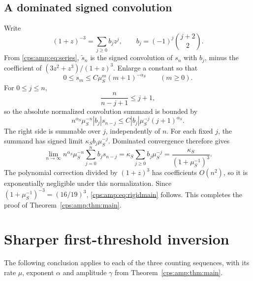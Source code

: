 \documentclass[11pt,letterpaper]{article}
\numberwithin{equation}{section}
\theoremstyle{remark}\newtheorem{remark}[theorem]{Remark}
\begin{document}
\subsection{A dominated signed convolution}
Write
\begin{equation}
 (1+z)^{-3}=\sum_{j\ge0}b_jz^j,\qquad
 b_j=(-1)^j\binom{j+2}{2}.
\end{equation}
From \eqref{cps:amp:eq:series}, $\widetilde s_n$ is the signed convolution of $s_n$ with $b_j$, minus the coefficient of $(3z^2+z^3)/(1+z)^3$. Enlarge a constant so that
\begin{equation}
 0\le s_m\le C\mu_S^m(m+1)^{-\alpha_S}\qquad(m\ge0).
\end{equation}
For $0\le j\le n$,
\begin{equation}
 \frac{n}{n-j+1}\le j+1,
\end{equation}
so the absolute normalized convolution summand is bounded by
\begin{equation}\label{cps:amp:eq:convolutionmajorant}
 n^{\alpha_S}\mu_S^{-n}|b_j|s_{n-j}
 \le C|b_j|\mu_S^{-j}(j+1)^{\alpha_S}.
\end{equation}
The right side is summable over $j$, independently of $n$. For each fixed $j$, the summand has signed limit $\kappa_Sb_j\mu_S^{-j}$. Dominated convergence therefore gives
\begin{equation}
 \lim_{n\to\infty}n^{\alpha_S}\mu_S^{-n}
 \sum_{j=0}^nb_js_{n-j}
 =\kappa_S\sum_{j\ge0}b_j\mu_S^{-j}
 =\frac{\kappa_S}{(1+\mu_S^{-1})^3}.
\end{equation}
The polynomial correction divided by $(1+z)^3$ has coefficients $O(n^2)$, so it is exponentially negligible under this normalization. Since $(1+\mu_S^{-1})^{-3}=(16/19)^3$, \eqref{cps:amp:eq:rigidmain} follows. This completes the proof of Theorem~\ref{cps:amp:thm:main}.

\section{Sharper first-threshold inversion}\label{cps:amp:sec:inverse}
The following conclusion applies to each of the three counting sequences, with its rate $\mu$, exponent $\alpha$ and amplitude $\gamma$ from Theorem~\ref{cps:amp:thm:main}.
\end{document}
